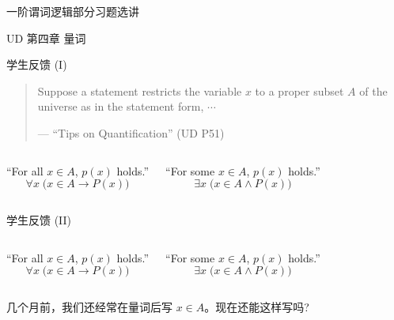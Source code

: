 \begin{frame}{}
  \centerline{\LARGE 一阶谓词逻辑部分习题选讲}
  \vspace{0.50cm}
  \centerline{\large UD 第四章 \; 量词}
\end{frame}

\begin{frame}{学生反馈 (I)}
  \begin{quote}
    Suppose a statement restricts the variable $x$ to a proper subset $A$
    of the universe as in the statement form, $\cdots$

    \hfill --- ``Tips on Quantification'' (UD P51)
  \end{quote}
  
  \vspace{0.60cm}
  \begin{columns}
      ``For all $x \in A$, $p(x)$ holds.''
      \[
	\forall x \; \Big(x \in A \to P(x)\Big)
      \]

      ``For some $x \in A$, $p(x)$ holds.''
      \[
	\exists x \; \Big(x \in A \land P(x)\Big)
      \]

  \end{columns}

  \vspace{0.30cm}
  \centerline{}
\end{frame}

\begin{frame}{学生反馈 (II)}
  \begin{columns}
      ``For all $x \in A$, $p(x)$ holds.''
      \[
	\forall x \; \Big(x \in A \to P(x)\Big)
      \]

      ``For some $x \in A$, $p(x)$ holds.''
      \[
	\exists x \; \Big(x \in A \land P(x)\Big)
      \]

  \end{columns}

  \vspace{0.30cm}
  \centerline{ 几个月前，我们还经常在量词后写 $x \in A$。现在还能这样写吗?}
\end{frame}

